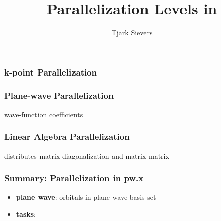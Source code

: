 \documentclass[aspectratio=169]{beamer}
\title[Parallelization Levels in \QE]{Parallelization Levels in \QE}
\author{Tjark Sievers}
\date{}
\institute[I. ITP -- AG ESoCM]{I. Institute of Theoretical Physics}
\begin{document}
{
\begin{frame}
	\titlepage
\end{frame}
}
\addtocounter{framenumber}{-1}

\begin{frame}
	\frametitle{k-point Parallelization}

	

\end{frame}

\begin{frame}
	\frametitle{Plane-wave Parallelization}

	wave-function coefficients
\end{frame}

\begin{frame}
	\frametitle{Linear Algebra Parallelization}

	distributes matrix diagonalization and matrix-matrix 	

\end{frame}

\begin{frame}
	\frametitle{Summary: Parallelization in pw.x}

	\begin{itemize}
		\item \textbf{plane wave}: orbitals in plane wave basis set
		
		\item \textbf{tasks}: 
	\end{itemize}
\end{frame}
\end{document}

